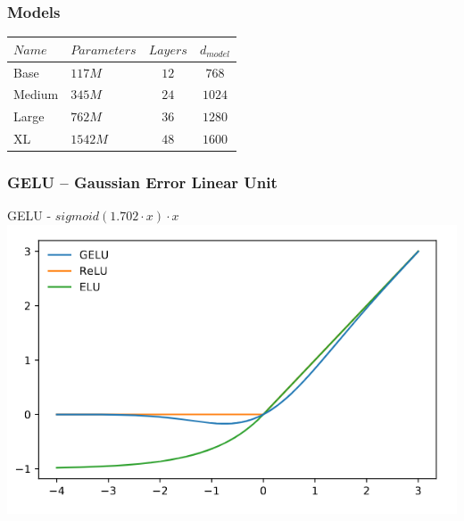\documentclass{beamer}
\begin{document}
\begin{frame}
    \frametitle{Models}
    \begin{center}
    	\begin{tabular}{ l | l | c | c}
    		$Name$ & $Parameters$ & $Layers$ & $d_{model}$ \\
    		\hline
    		Base & $117M$ & $12$ & $768$ \\
    		Medium & $345M$ & $24$ & $1024$ \\
    		Large & $762M$ & $36$ & $1280$ \\
    		XL & $1542M$ & $48$ & $1600$ \\
    	\end{tabular}
    \end{center}
\end{frame}

\begin{frame}
    \frametitle{GELU -- Gaussian Error Linear Unit \cite{gelu}}
    \begin{center}
        GELU - $ sigmoid(1.702 \cdot x) \cdot x $ \\
        \includegraphics[scale=2.0]{img/gelu.png}
    \end{center}
\end{frame}
\end{document}
